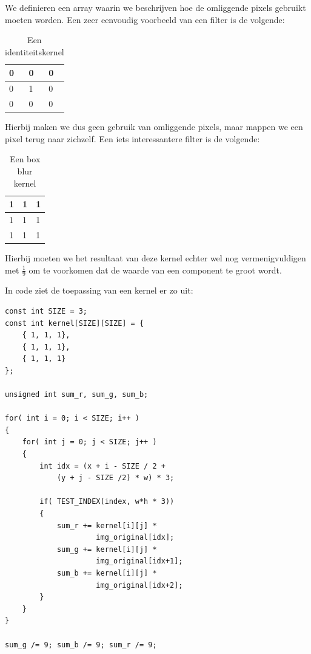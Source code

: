 \documentclass[10pt, twocolumn, a4paper]{article}
\begin{document}
We definieren een array waarin we beschrijven hoe de omliggende pixels gebruikt moeten worden. Een zeer eenvoudig voorbeeld van een filter is de volgende:

\begin{table}[H]
    \centering
    \begin{tabular}{|l|l|l|}
        \hline
        0 & 0 & 0 \\ \hline
        0 & 1 & 0 \\ \hline
        0 & 0 & 0 \\
        \hline
    \end{tabular}
    \caption{Een identiteitskernel}
\end{table}

Hierbij maken we dus geen gebruik van omliggende pixels, maar mappen we een pixel terug naar zichzelf. Een iets interessantere filter is de volgende:

\begin{table}[H]
    \centering
    \begin{tabular}{|l|l|l|}
        \hline
        1 & 1 & 1 \\ \hline
        1 & 1 & 1 \\ \hline
        1 & 1 & 1 \\
        \hline
    \end{tabular}
    \caption{Een box blur kernel}
\end{table}

Hierbij moeten we het resultaat van deze kernel echter wel nog vermenigvuldigen met $\frac{1}{9}$ om te voorkomen dat de waarde van een component te groot wordt.

In code ziet de toepassing van een kernel er zo uit:

\begin{verbatim}
const int SIZE = 3;
const int kernel[SIZE][SIZE] = {
    { 1, 1, 1},
    { 1, 1, 1},
    { 1, 1, 1}
};

unsigned int sum_r, sum_g, sum_b;

for( int i = 0; i < SIZE; i++ )
{
    for( int j = 0; j < SIZE; j++ )
    {
        int idx = (x + i - SIZE / 2 + 
            (y + j - SIZE /2) * w) * 3;
        
        if( TEST_INDEX(index, w*h * 3))
        {
            sum_r += kernel[i][j] * 
                     img_original[idx];
            sum_g += kernel[i][j] *
                     img_original[idx+1];
            sum_b += kernel[i][j] *
                     img_original[idx+2];
        }
    }
}

sum_g /= 9; sum_b /= 9; sum_r /= 9;

\end{verbatim}
\end{document}
